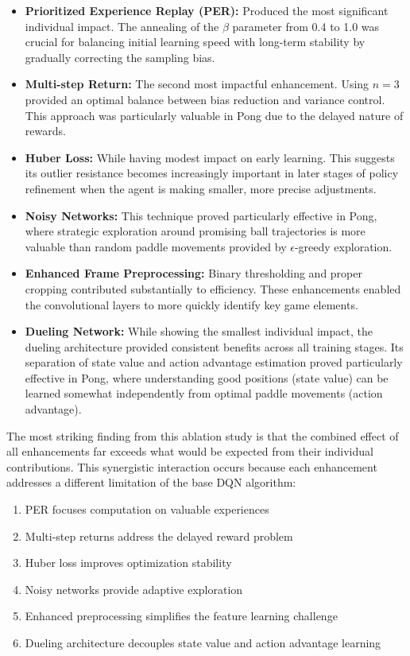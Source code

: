 \documentclass[a4paper]{article}
\begin{document}
\begin{itemize}
    \item \textbf{Prioritized Experience Replay (PER):} Produced the most significant individual impact. The annealing of the $\beta$ parameter from 0.4 to 1.0 was crucial for balancing initial learning speed with long-term stability by gradually correcting the sampling bias.
    
    \item \textbf{Multi-step Return:} The second most impactful enhancement. Using $n=3$ provided an optimal balance between bias reduction and variance control. This approach was particularly valuable in Pong due to the delayed nature of rewards.
    
    \item \textbf{Huber Loss:} While having modest impact on early learning. This suggests its outlier resistance becomes increasingly important in later stages of policy refinement when the agent is making smaller, more precise adjustments.
    
    \item \textbf{Noisy Networks:} This technique proved particularly effective in Pong, where strategic exploration around promising ball trajectories is more valuable than random paddle movements provided by $\epsilon$-greedy exploration.
    
    \item \textbf{Enhanced Frame Preprocessing:} Binary thresholding and proper cropping contributed substantially to efficiency. These enhancements enabled the convolutional layers to more quickly identify key game elements.
    
    \item \textbf{Dueling Network:} While showing the smallest individual impact, the dueling architecture provided consistent benefits across all training stages. Its separation of state value and action advantage estimation proved particularly effective in Pong, where understanding good positions (state value) can be learned somewhat independently from optimal paddle movements (action advantage).
\end{itemize}

The most striking finding from this ablation study is that the combined effect of all enhancements far exceeds what would be expected from their individual contributions. This synergistic interaction occurs because each enhancement addresses a different limitation of the base DQN algorithm:

\begin{enumerate}
    \item PER focuses computation on valuable experiences
    \item Multi-step returns address the delayed reward problem
    \item Huber loss improves optimization stability
    \item Noisy networks provide adaptive exploration
    \item Enhanced preprocessing simplifies the feature learning challenge
    \item Dueling architecture decouples state value and action advantage learning
\end{enumerate}
\end{document}
